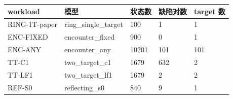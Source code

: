 \begin{tabular}{lllll}
\toprule
workload & 模型 & 状态数 & 缺陷对数 & target 数 \\
\midrule
RING-1T-paper & ring\_single\_target & 100 & 1 & 1 \\
ENC-FIXED & encounter\_fixed & 900 & 0 & 1 \\
ENC-ANY & encounter\_any & 10201 & 101 & 101 \\
TT-C1 & two\_target\_c1 & 1679 & 632 & 2 \\
TT-LF1 & two\_target\_lf1 & 1679 & 2 & 2 \\
REF-S0 & reflecting\_s0 & 840 & 9 & 1 \\
\bottomrule
\end{tabular}
